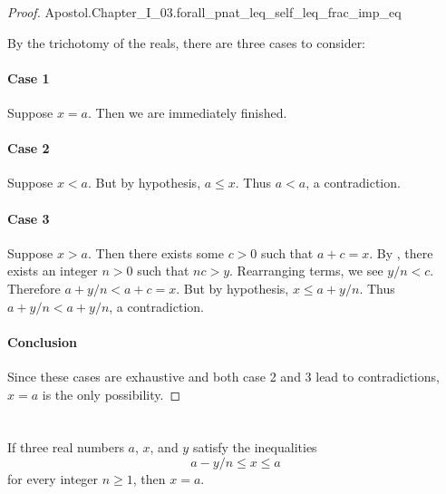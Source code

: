 \documentclass{report}
\begin{document}
\begin{proof}

    {Apostol.Chapter\_I\_03.forall\_pnat\_leq\_self\_leq\_frac\_imp\_eq}

  By the trichotomy of the reals, there are three cases to consider:

  \paragraph{Case 1}%

    Suppose $x = a$.
    Then we are immediately finished.

  \paragraph{Case 2}%

    Suppose $x < a$.
    But by hypothesis, $a \leq x$.
    Thus $a < a$, a contradiction.

  \paragraph{Case 3}%

    Suppose $x > a$.
    Then there exists some $c > 0$ such that $a + c = x$.
    By , there exists an integer $n > 0$
      such that $nc > y$.
    Rearranging terms, we see $y / n < c$.
    Therefore $a + y / n < a + c = x$.
    But by hypothesis, $x \leq a + y / n$.
    Thus $a + y / n < a + y / n$, a contradiction.

  \paragraph{Conclusion}%

    Since these cases are exhaustive and both case 2 and 3 lead to
      contradictions, $x = a$ is the only possibility.

\end{proof}

\section{}%
\label{sec:lemma-2}

\begin{lemma}[2]

  If three real numbers $a$, $x$, and $y$ satisfy the inequalities
    $$a - y / n \leq x \leq a$$ for every integer $n \geq 1$, then $x = a$.

\end{lemma}
\end{document}
